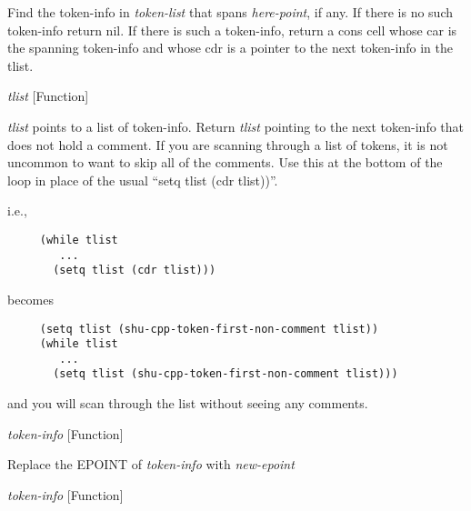 \begin{doc-string}
Find the token-info in \emph{token-list} that spans \emph{here-point}, if any.  If there
is no such token-info return nil.  If there is such a token-info, return a
cons cell whose car is the spanning token-info and whose cdr is a pointer
to the next token-info in the tlist.
\end{doc-string}

\vspace{1em}
\noindent
{}
\usebox{\funcname}\emph{tlist}
 \hfill [Function]

\begin{doc-string}
\emph{tlist} points to a list of token-info.  Return \emph{tlist} pointing to the next
token-info that does not hold a comment.  If you are scanning through a list
of tokens, it is not uncommon to want to skip all of the comments.  Use this
at the bottom of the loop in place of the usual ``setq tlist (cdr tlist))''.

i.e.,

\small{\begin{verbatim}
     (while tlist
        ...
       (setq tlist (cdr tlist)))
\end{verbatim}}

becomes

\small{\begin{verbatim}
     (setq tlist (shu-cpp-token-first-non-comment tlist))
     (while tlist
        ...
       (setq tlist (shu-cpp-token-first-non-comment tlist)))
\end{verbatim}}

and you will scan through the list without seeing any comments.
\end{doc-string}

\vspace{1em}
\noindent
{}
\usebox{\funcname}\emph{token-info}
 \hfill [Function]
\hspace*{\wd\funcname}

\begin{doc-string}
Replace the EPOINT of \emph{token-info} with \emph{new-epoint}
\end{doc-string}

\vspace{1em}
\noindent
{}
\usebox{\funcname}\emph{token-info}
 \hfill [Function]
\hspace*{\wd\funcname}

